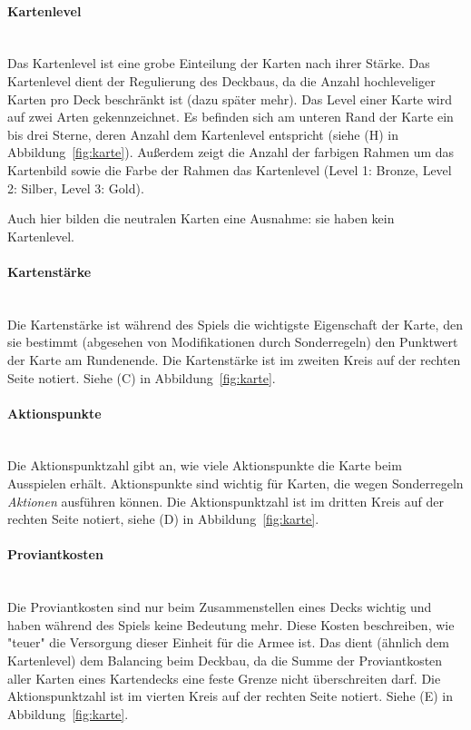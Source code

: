 \documentclass[a4paper,11pt]{report}
\newcommand{\fref}[1]{Abbildung~\ref{#1}}
\begin{document}
\paragraph{Kartenlevel}~\\
Das Kartenlevel ist eine grobe Einteilung der Karten nach ihrer Stärke. Das Kartenlevel dient der Regulierung des Deckbaus, da die Anzahl hochleveliger Karten pro Deck beschränkt ist (dazu später mehr).
Das Level einer Karte wird auf zwei Arten gekennzeichnet. Es befinden sich am unteren Rand der Karte ein bis drei Sterne, deren Anzahl dem Kartenlevel entspricht (siehe (H) in \fref{fig:karte}). Außerdem zeigt die Anzahl der farbigen Rahmen um das Kartenbild sowie die Farbe der Rahmen das Kartenlevel (Level 1: Bronze, Level 2: Silber, Level 3: Gold).

Auch hier bilden die neutralen Karten eine Ausnahme: sie haben kein Kartenlevel.

\paragraph{Kartenstärke}~\\
Die Kartenstärke ist während des Spiels die wichtigste Eigenschaft der Karte, den sie bestimmt (abgesehen von Modifikationen durch Sonderregeln) den Punktwert der Karte am Rundenende. Die Kartenstärke ist im zweiten Kreis auf der rechten Seite notiert. Siehe (C) in \fref{fig:karte}.

\paragraph{Aktionspunkte}~\\
Die Aktionspunktzahl gibt an, wie viele Aktionspunkte die Karte beim Ausspielen erhält. Aktionspunkte sind wichtig für Karten, die wegen Sonderregeln \emph{Aktionen} ausführen können. Die Aktionspunktzahl ist im dritten Kreis auf der rechten Seite notiert, siehe (D) in \fref{fig:karte}.

\paragraph{Proviantkosten}~\\
Die Proviantkosten sind nur beim Zusammenstellen eines Decks wichtig und haben während des Spiels keine Bedeutung mehr. Diese Kosten beschreiben, wie "teuer" die Versorgung dieser Einheit für die Armee ist.
Das dient (ähnlich dem Kartenlevel) dem Balancing beim Deckbau, da die Summe der Proviantkosten aller Karten eines Kartendecks eine feste Grenze nicht überschreiten darf.
Die Aktionspunktzahl ist im vierten Kreis auf der rechten Seite notiert. Siehe (E) in \fref{fig:karte}.
\end{document}
